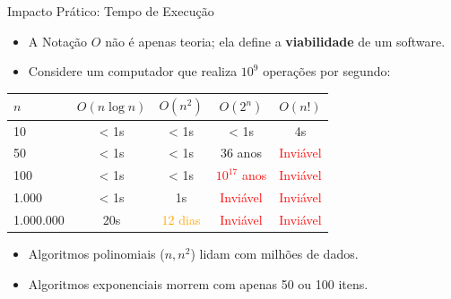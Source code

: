 \documentclass[aspectratio=169]{beamer}
\begin{document}
\begin{frame}{Impacto Prático: Tempo de Execução}
    \begin{itemize}
        \item A Notação $O$ não é apenas teoria; ela define a \textbf{viabilidade} de um software.
        \item Considere um computador que realiza $10^9$ operações por segundo:
    \end{itemize}

    \centering
    \scriptsize
    \begin{tabular}{|l|c|c|c|c|}
        \hline
        $n$ & $O(n \log n)$ & $O(n^2)$ & $O(2^n)$ & $O(n!)$ \\ \hline
        10 & < 1s & < 1s & < 1s & 4s \\ \hline
        50 & < 1s & < 1s & 36 anos & \textcolor{red}{Inviável} \\ \hline
        100 & < 1s & < 1s & \textcolor{red}{$10^{17}$ anos} & \textcolor{red}{Inviável} \\ \hline
        1.000 & < 1s & 1s & \textcolor{red}{Inviável} & \textcolor{red}{Inviável} \\ \hline
        1.000.000 & 20s & \textcolor{orange}{12 dias} & \textcolor{red}{Inviável} & \textcolor{red}{Inviável} \\ \hline
    \end{tabular}

    \vspace{0.4cm}
    \begin{itemize}
        \item Algoritmos polinomiais ($n, n^2$) lidam com milhões de dados.
        \item Algoritmos exponenciais morrem com apenas 50 ou 100 itens.
    \end{itemize}
\end{frame}
\end{document}
